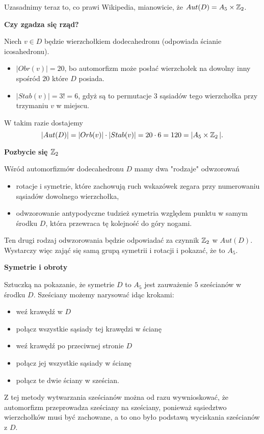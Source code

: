 \documentclass{article}
\begin{document}
\begin{wrapfigure}{l}{7cm}

\end{wrapfigure}

Uzasadnimy teraz to, co prawi Wikipedia, mianowicie, że $Aut(D)=A_5\times \operatorname{\mathbb{Z}}_2$.

\textbf{Czy zgadza się rząd?}

Niech $v\in D$ będzie wierzchołkiem dodecahedronu (odpowiada ścianie icosahedronu). 
\begin{itemize}
  \item $|Obr(v)|=20$, bo automorfizm może posłać wierzchołek na dowolny inny spośród $20$ które $D$ posiada.
  \item $|Stab(v)| = 3!=6$, gdyż są to permutacje $3$ sąsiadów tego wierzchołka przy trzymaniu $v$ w miejscu.
\end{itemize}
W takim razie dostajemy
$$|Aut(D)|=|Orb(v)|\cdot|Stab(v)|=20\cdot 6=120=|A_5\times \operatorname{\mathbb{Z}}_2|.$$

\textbf{Pozbycie się $\operatorname{\mathbb{Z}}_2$}

Wśród automorfizmów dodecahedronu $D$ mamy dwa "rodzaje" odwzorowań
\begin{itemize}
  \item rotacje i symetrie, które zachowują ruch wskazówek zegara przy numerowaniu sąsiadów dowolnego wierzchołka,
  \item odwzorowanie antypodyczne tudzież symetria względem punktu w samym środku $D$, która przewraca tę kolejność do góry nogami.
\end{itemize}
Ten drugi rodzaj odwzorowania będzie odpowiadać za czynnik $\operatorname{\mathbb{Z}}_2$ w $Aut(D)$. Wystarczy więc zająć się samą grupą symetrii i rotacji i pokazać, że to $A_5$.

\textbf{Symetrie i obroty}

Sztuczką na pokazanie, że symetrie $D$ to $A_5$ jest zauważenie $5$ sześcianów w środku $D$. Sześciany możemy narysować idąc krokami:
\begin{itemize}
  \item weź krawędź w $D$
  \item połącz wszystkie sąsiady tej krawędzi w ścianę
  \item weź krawędź po przeciwnej stronie $D$
  \item połącz jej wszystkie sąsiady w ścianę
  \item połącz te dwie ściany w sześcian.
\end{itemize}
Z tej metody wytwarzania sześcianów można od razu wywnioskować, że automorfizm przeprowadza sześciany na sześciany, ponieważ sąsiedztwo wierzchołków musi być zachowane, a to ono było podstawą wyciskania sześcianów z $D$.
\end{document}
